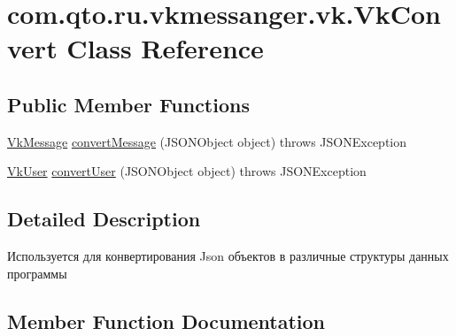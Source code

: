 \hypertarget{classcom_1_1qto_1_1ru_1_1vkmessanger_1_1vk_1_1_vk_convert}{}\section{com.\+qto.\+ru.\+vkmessanger.\+vk.\+Vk\+Convert Class Reference}
\label{classcom_1_1qto_1_1ru_1_1vkmessanger_1_1vk_1_1_vk_convert}
\subsection*{Public Member Functions}
\begin{DoxyCompactItemize}
\item 
\hyperlink{classcom_1_1qto_1_1ru_1_1vkmessanger_1_1vk_1_1_vk_message}{Vk\+Message} \hyperlink{classcom_1_1qto_1_1ru_1_1vkmessanger_1_1vk_1_1_vk_convert_a7ac6ea2839a5db3a3602431fc58e2c3d}{convert\+Message} (J\+S\+O\+N\+Object object)  throws J\+S\+O\+N\+Exception 
\item 
\hyperlink{classcom_1_1qto_1_1ru_1_1vkmessanger_1_1vk_1_1_vk_user}{Vk\+User} \hyperlink{classcom_1_1qto_1_1ru_1_1vkmessanger_1_1vk_1_1_vk_convert_ab5ae37fecd94afecd03efc3f50049524}{convert\+User} (J\+S\+O\+N\+Object object)  throws J\+S\+O\+N\+Exception 
\end{DoxyCompactItemize}


\subsection{Detailed Description}
Используется для конвертирования Json объектов в различные структуры данных программы 

\subsection{Member Function Documentation}
\hypertarget{classcom_1_1qto_1_1ru_1_1vkmessanger_1_1vk_1_1_vk_convert_a7ac6ea2839a5db3a3602431fc58e2c3d}{}
